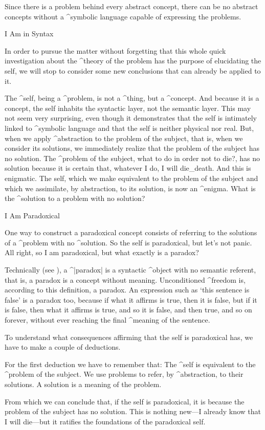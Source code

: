 Since there is a problem behind every abstract concept, there can be no
abstract concepts without a ^{symbolic language} capable of expressing
the problems.


\Section I Am in Syntax

In order to pursue the matter without forgetting that this whole quick
investigation about the ^{theory of the problem} has the purpose of
elucidating the self, we will stop to consider some new conclusions that
can already be applied to it.

The ^{self}, being a ^{problem}, is not a ^{thing}, but a ^{concept}.
And because it is a concept, the self inhabits the syntactic layer, not
the semantic layer. This may not seem very surprising, even though it
demonstrates that the self is intimately linked to ^{symbolic language}
and that the self is neither physical nor real. But, when we apply
^{abstraction} to the problem of the subject, that is, when we consider
its solutions, we immediately realize that the problem of the subject
has no solution. The ^{problem of the subject}, what to do in order not
to die?, has no solution because it is certain that, whatever I do, I
will die_{death}. And this is enigmatic. The self, which we make
equivalent to the problem of the subject and which we assimilate, by
abstraction, to its solution, is now an ^{enigma}. What is the
^{solution} to a problem with no solution?


\Section I Am Paradoxical

One way to construct a paradoxical concept consists of referring to the
solutions of a ^{problem} with no ^{solution}. So the self is
paradoxical, but let's not panic. All right, so I am paradoxical, but
what exactly is a paradox?

Technically (see ), a ^|paradox| is a syntactic ^{object}
with no semantic referent, that is, a paradox is a concept without
meaning. Unconditioned ^{freedom} is, according to this definition, a
paradox. An expression such as `this sentence is false' is a paradox
too, because if what it affirms is true, then it is false, but if it is
false, then what it affirms is true, and so it is false, and then true,
and so on forever, without ever reaching the final ^{meaning} of the
sentence.

To understand what consequences affirming that the self is paradoxical
has, we have to make a couple of deductions.

For the first deduction we have to remember that:
\beginpoints
\point The ^{self} is equivalent to the ^{problem of the subject}.
\point We use problems to refer, by ^{abstraction}, to their solutions.
\point A solution is a meaning of the problem.
\par\noindent From which we can conclude that, if the self is paradoxical,
it is because the problem of the subject has no solution. This is
nothing new---I already know that I will die---but it ratifies the
foundations of the paradoxical self.
\endpoints

